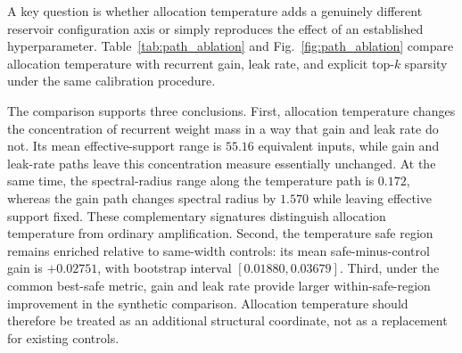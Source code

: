 \documentclass[preprint,12pt,authoryear]{elsarticle}
\begin{document}
A key question is whether allocation temperature adds a genuinely different reservoir configuration axis or simply reproduces the effect of an established hyperparameter. Table~\ref{tab:path_ablation} and Fig.~\ref{fig:path_ablation} compare allocation temperature with recurrent gain, leak rate, and explicit top-$k$ sparsity under the same calibration procedure.

\begin{table}[t]
\centering
\caption{Comparison of four one-dimensional reservoir controls. Allocation temperature changes the continuous concentration of recurrent weight mass while the bulk scale is normalized. Gain changes recurrent scale, leak rate changes the update timescale, and top-$k$ sparsity changes the hard connectivity pattern.}
\label{tab:path_ablation}
\end{table}

The comparison supports three conclusions. First, allocation temperature changes the concentration of recurrent weight mass in a way that gain and leak rate do not. Its mean effective-support range is $55.16$ equivalent inputs, while gain and leak-rate paths leave this concentration measure essentially unchanged. At the same time, the spectral-radius range along the temperature path is $0.172$, whereas the gain path changes spectral radius by $1.570$ while leaving effective support fixed. These complementary signatures distinguish allocation temperature from ordinary amplification. Second, the temperature safe region remains enriched relative to same-width controls: its mean safe-minus-control gain is $+0.02751$, with bootstrap interval $[0.01880,0.03679]$. Third, under the common best-safe metric, gain and leak rate provide larger within-safe-region improvement in the synthetic comparison. Allocation temperature should therefore be treated as an additional structural coordinate, not as a replacement for existing controls.
\end{document}
